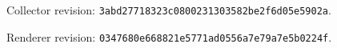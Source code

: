 \noindent Collector revision: \texttt{3abd27718323c0800231303582be2f6d05e5902a}.\par
Renderer revision: \texttt{0347680e668821e5771ad0556a7e79a7e5b0224f}.\par
